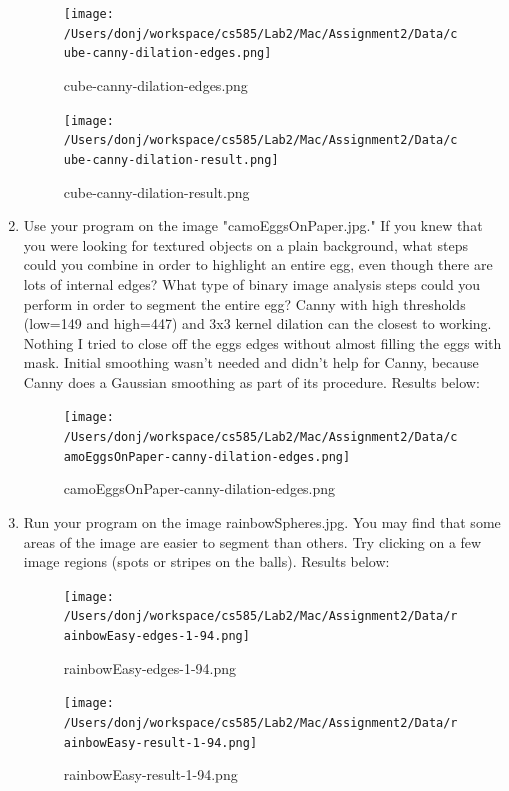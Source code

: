 \documentclass{article}
\begin{document}
\begin{enumerate}
\begin{figure}[H]
\centering
\texttt{[image: /Users/donj/workspace/cs585/Lab2/Mac/Assignment2/Data/cube-canny-dilation-edges.png]}
\caption{cube-canny-dilation-edges.png}
\label{overflow}
\end{figure}

\begin{figure}[H]
\centering
\texttt{[image: /Users/donj/workspace/cs585/Lab2/Mac/Assignment2/Data/cube-canny-dilation-result.png]}
\caption{cube-canny-dilation-result.png}
\label{overflow}
\end{figure}

\item
Use your program on the image "camoEggsOnPaper.jpg." If you knew that you were looking for textured objects on a plain background, what steps could you combine in order to highlight an entire egg, even though there are lots of internal edges? What type of binary image analysis steps could you perform in order to segment the entire egg? Canny with high thresholds (low=149 and high=447) and 3x3 kernel dilation can the closest to working. Nothing I tried to close off the eggs edges without almost filling the eggs with mask. Initial smoothing wasn't needed and didn't help for Canny, because Canny does a Gaussian smoothing as part of its procedure. Results below:

\begin{figure}[H]
\centering
\texttt{[image: /Users/donj/workspace/cs585/Lab2/Mac/Assignment2/Data/camoEggsOnPaper-canny-dilation-edges.png]}
\caption{camoEggsOnPaper-canny-dilation-edges.png}
\label{overflow}
\end{figure}


\item
Run your program on the image rainbowSpheres.jpg. You may find that some areas of the image are easier to segment than others. Try clicking on a few image regions (spots or stripes on the balls). Results below:

\begin{figure}[H]
\centering
\texttt{[image: /Users/donj/workspace/cs585/Lab2/Mac/Assignment2/Data/rainbowEasy-edges-1-94.png]}
\caption{rainbowEasy-edges-1-94.png}
\label{overflow}
\end{figure}

\begin{figure}[H]
\centering
\texttt{[image: /Users/donj/workspace/cs585/Lab2/Mac/Assignment2/Data/rainbowEasy-result-1-94.png]}
\caption{rainbowEasy-result-1-94.png}
\label{overflow}
\end{figure}






\end{enumerate}
\end{document}
